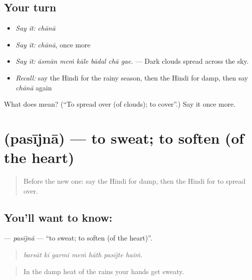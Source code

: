 \subsection*{Your turn}
\begin{itemize}
\raggedright
  \item \emph{Say it:} \emph{chānā}
  \item \emph{Say it:} \emph{chānā}, once more
  \item \emph{Say it:} \emph{āsmān meṁ kāle bādal chā gae.} — Dark clouds spread across the sky.
  \item \emph{Recall:} say the Hindi for the rainy season, then the Hindi for damp, then say \emph{chānā} again
\end{itemize}

\begin{tcolorbox}[breakable,colback=teal!4,colframe=teal!35!black,title={Before you move on}]
What does  mean? (\textquotedblleft{}To spread over (of clouds); to cover\textquotedblright{}.) Say it once more.
\end{tcolorbox}
\section[\texorpdfstring{\hi{पसीजना} (pasījnā)}{पसीजना (pasījnā)}]{ (pasījnā) — to sweat; to soften (of the heart)}

\label{lesson:HI-C437-pasijna}



\begin{quote}
Before the new one: say the Hindi for damp, then the Hindi for to spread over.
\end{quote}

\subsection*{You'll want to know: }
\textbf{} — \emph{pasījnā} — \textquotedblleft{}to sweat; to soften (of the heart)\textquotedblright{}.

\begin{quote}
      
\end{quote}

\begin{quote}
\emph{barsāt kī garmī meṁ hāth pasījte haiṁ.}
\end{quote}

\begin{quote}
In the damp heat of the rains your hands get sweaty.
\end{quote}

